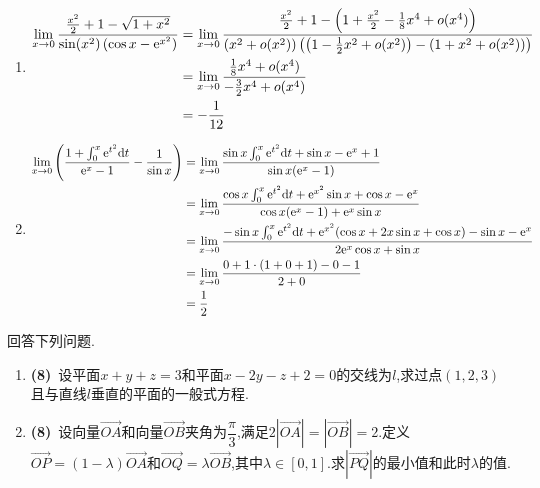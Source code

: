 \documentclass{ctexart}
\begin{document}
\begin{solution}
    \begin{enumerate}[label=\textbf{(\arabic*)},leftmargin=*]
        \item \[\begin{aligned}
                \lim_{x\to0}\dfrac{\frac{x^2}{2}+1-\sqrt{1+x^2}}{\sin(x^2)\left(\cos x-\mathrm{e}^{x^2}\right)}
                &= \lim_{x\to0}\dfrac{\frac{x^2}{2}+1-\left(1+\frac{x^2}{2}-\frac{1}{8}x^4+o(x^4)\right)}{\left(x^2+o(x^2)\right)\left(\left(1-\frac{1}{2}x^2+o(x^2)\right)-\left(1+x^2+o(x^2)\right)\right)} \\
                &= \lim_{x\to0}\dfrac{\frac{1}{8}x^4+o(x^4)}{-\frac{3}{2}x^4+o(x^4)} \\
                &= -\dfrac{1}{12}
            \end{aligned}\]
        \item \[\begin{aligned}
            \lim_{x\to0}\left(\dfrac{1+\int_0^x\mathrm{e}^{t^2}\mathrm{d} t}{\mathrm{e}^x-1}-\dfrac{1}{\sin x}\right)
            &= \lim_{x\to0}\dfrac{\sin x\int_0^x\mathrm{e}^{t^2}\mathrm{d} t+\sin x-\mathrm{e}^x+1}{\sin x(\mathrm{e}^x-1)} \\
            &= \lim_{x\to0}\dfrac{\cos x\int_0^x\mathrm{e}^{t^2}\mathrm{d} t+\mathrm{e}^{x^2}\sin x+\cos x-\mathrm{e}^x}{\cos x(\mathrm{e}^x -1)+\mathrm{e}^x\sin x} \\
            &= \lim_{x\to0}\dfrac{-\sin x\int_0^x\mathrm{e}^{t^2}\mathrm{d} t+\mathrm{e}^{x^2}(\cos x+2x\sin x+\cos x)-\sin x-\mathrm{e}^x}{2\mathrm{e}^x\cos x+\sin x} \\
            &= \lim_{x\to0}\dfrac{0+1\cdot(1+0+1)-0-1}{2+0} \\
            &= \dfrac{1}{2}
        \end{aligned}\]
    \end{enumerate}
\end{solution}
\begin{problem}[3.(16\songti{分})]
    回答下列问题.
    \begin{enumerate}[label=\textbf{(\arabic*)},leftmargin=*]
        \item \textbf{(8)}\ 设平面$x+y+z=3$和平面$x-2y-z+2=0$的交线为$l$,求过点$(1,2,3)$且与直线$l$垂直的平面的一般式方程.
        \item \textbf{(8)}\ 设向量$\overrightarrow{OA}$和向量$\overrightarrow{OB}$夹角为$\dfrac\pi3$,满足$2\left|\overrightarrow{OA}\right|=\left|\overrightarrow{OB}\right|=2$.定义$\overrightarrow{OP}=(1-\lambda)\overrightarrow{OA}$和$\overrightarrow{OQ}=\lambda\overrightarrow{OB}$,其中$\lambda\in[0,1]$.求$\left|\overrightarrow{PQ}\right|$的最小值和此时$\lambda$的值.
    \end{enumerate}
\end{problem}
\end{document}

